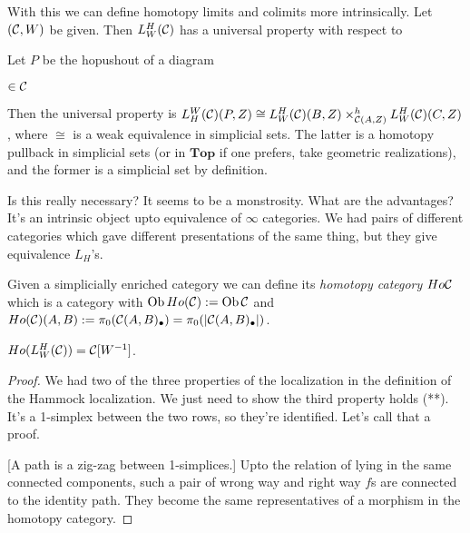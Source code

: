 \documentclass[../MH_Total.tex]{subfiles}
\begin{document}
With this we can define homotopy limits and colimits more intrinsically. Let $(\mathcal{C},W)$ be given. Then $L_W^H(\mathcal{C})$ has a universal property with respect to 

\begin{example}
	Let $P$ be the hopushout of a diagram
	\begin{center}
		$\in \mathcal{C}$
	\end{center}

	Then the universal property is $L_H^W(\mathcal{C})(P,Z) \cong L_W^H(\mathcal{C})(B,Z) \times^h_{\mathcal{C}(A,Z)} L_W^H(\mathcal{C})(C,Z)$, where $\cong$ is a weak equivalence in simplicial sets. The latter is a homotopy pullback in simplicial sets (or in $\mathbf{Top}$ if one prefers, take geometric realizations), and the former is a simplicial set by definition.
\end{example}

Is this really necessary? It seems to be a monstrosity. What are the advantages? It's an intrinsic object upto equivalence of $\infty$ categories. We had pairs of different categories which gave different presentations of the same thing, but they give equivalence $L_H$'s.

\begin{definition}
	Given a simplicially enriched category we can define its \emph{homotopy category} $Ho\mathcal{C}$ which is a category with $\operatorname{Ob}Ho(\mathcal{C}) := \operatorname{Ob}\mathcal{C}$ and $Ho(\mathcal{C})(A,B) := \pi_0(\mathcal{C}(A,B)_\bullet) = \pi_0(|\mathcal{C}(A,B)_\bullet|)$.
\end{definition}

\begin{proposition}
	$Ho(L_W^H(\mathcal{C})) = \mathcal{C}[W^{-1}]$.
\end{proposition}

\begin{proof}
	We had two of the three properties of the localization in the definition of the Hammock localization. We just need to show the third property holds (**). It's a 1-simplex between the two rows, so they're identified. Let's call that a proof.

	[A path is a zig-zag between 1-simplices.] Upto the relation of lying in the same connected components, such a pair of wrong way and right way $f$s are connected to the identity path. They become the same representatives of a morphism in the homotopy category.
\end{proof}
\end{document}

